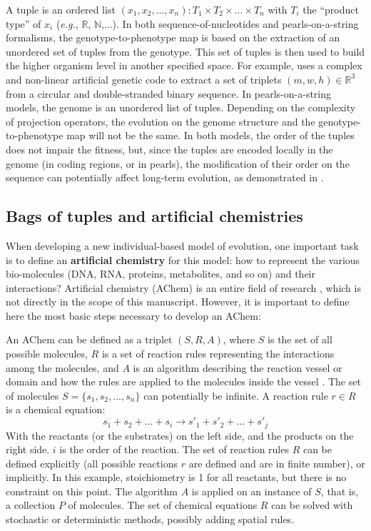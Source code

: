 A tuple is an ordered list $(x_1,x_2,...,x_n): T_1 \times T_2 \times ... \times T_n$ with $T_i$ the ``product type'' of $x_i$ (\textit{e.g.}, $\mathbb{R}$, $\mathbb{N}$,...). In both sequence-of-nucleotides and pearls-on-a-string formalisms, the genotype-to-phenotype map is based on the extraction of an unordered set of tuples from the genotype. This set of tuples is then used to build the higher organism level in another specified space. For example, {\aevol} uses a complex and non-linear artificial genetic code to extract a set of triplets $(m,w,h) \in \mathbb{R}^3$ from a circular and double-stranded binary sequence. In pearls-on-a-string models, the genome is an unordered list of tuples. Depending on the complexity of projection operators, the evolution on the genome structure and the genotype-to-phenotype map will not be the same. In both models, the order of the tuples does not impair the fitness, but, since the tuples are encoded locally in the genome (in coding regions, or in pearls), the modification of their order on the sequence can potentially affect long-term evolution, as demonstrated in \cite{knibbe-et-al-2007a,knibbe-et-al-2007b}.
 
\subsection{Bags of tuples and artificial chemistries}

When developing a new individual-based model of evolution, one important task is to define an \textbf{artificial chemistry} for this model: how to represent the various bio-molecules (DNA, RNA, proteins, metabolites, and so on) and their interactions? Artificial chemistry (AChem) is an entire field of research \citep{dittrich-2001,banzhaf-yamamoto-2015}, which is not directly in the scope of this manuscript. However, it is important to define here the most basic steps necessary to develop an AChem:

An AChem can be defined as a triplet $(S,R,A)$, where $S$ is the set of all possible molecules, $R$ is a set of reaction rules representing the interactions among the molecules, and $A$ is an algorithm describing the reaction vessel or domain and how the rules are applied to the molecules inside the vessel \citep{dittrich-2001}. The set of molecules $S = \{s_1,s_2,...,s_n\}$ can potentially be infinite. A reaction rule $r \in R$ is a chemical equation:
\begin{equation}
s_1 + s_2 + ... + s_i \rightarrow s'_1 + s'_2 + ... + s'_j
\end{equation}
With the reactants (or the substrates) on the left side, and the products on the right side. $i$ is the order of the reaction. The set of reaction rules $R$ can be defined explicitly (all possible reactions $r$ are defined and are in finite number), or implicitly. In this example, stoichiometry is 1 for all reactants, but there is no constraint on this point. The algorithm $A$ is applied on an instance of $S$, that is, a collection $P$ of molecules. The set of chemical equations $R$ can be solved with stochastic or deterministic methods, possibly adding spatial rules.

